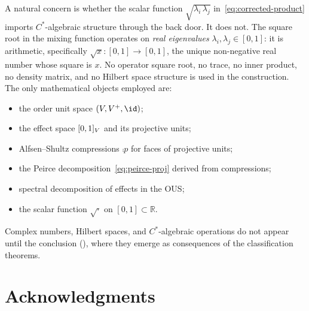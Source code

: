 \documentclass[11pt]{article}
\begin{document}
A natural concern is whether the scalar function
$\sqrt{\lambda_{i}\, \lambda_{j}}$
in~\eqref{eq:corrected-product} imports $C^{*}$-algebraic structure
through the back door.  It does not.  The square root in the mixing
function operates on \emph{real eigenvalues}
$\lambda_{i}, \lambda_{j} \in [0,1]$: it is arithmetic, specifically
$\sqrt{x} : [0,1] \to [0,1]$, the unique non-negative real number
whose square is $x$.  No operator square root, no trace, no inner
product, no density matrix, and no Hilbert space structure is used in
the construction.  The only mathematical objects employed are:
\begin{itemize}
  \item the order unit space $(V, V^{+}, \id)$;
  \item the effect space $[0,1]_{V}$ and its projective units;
  \item Alfsen--Shultz compressions $\comp{p}$ for faces of
    projective units;
  \item the Peirce decomposition~\eqref{eq:peirce-proj} derived from
    compressions;
  \item spectral decomposition of effects in the OUS;
  \item the scalar function $\sqrt{\cdot}$ on
    $[0,1] \subset \mathbb{R}$.
\end{itemize}
Complex numbers, Hilbert spaces, and $C^{*}$-algebraic operations do
not appear until the conclusion (), where they
emerge as consequences of the classification theorems.















\section*{Acknowledgments}
\end{document}
